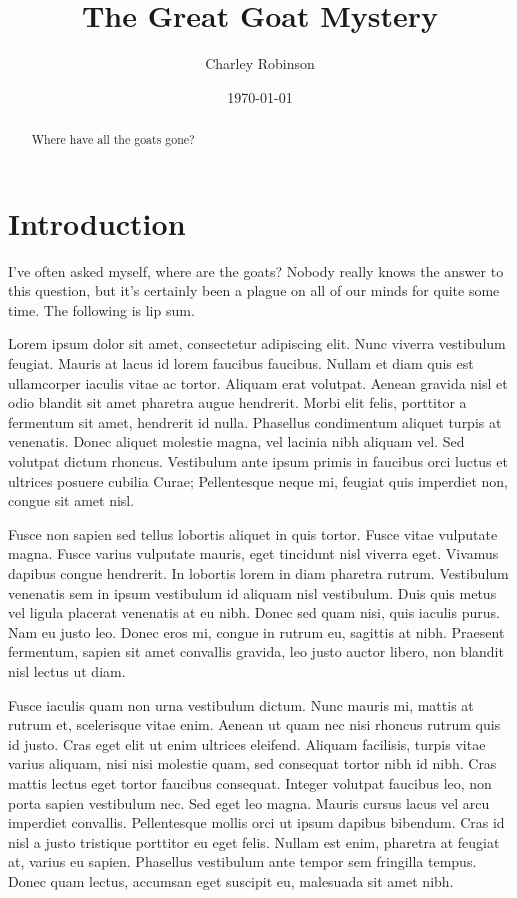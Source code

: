 \documentclass[12pt]{article}
\begin{document}
\title{The Great Goat Mystery}
\author{Charley Robinson}
\date{\today}
\maketitle

\begin{abstract}
Where have all the goats gone?
\end{abstract}

\pagebreak

\section{Introduction}

I've often asked myself, where are the goats? Nobody really knows the answer to this question, but it's certainly been a plague on all of our minds for quite some time. The following is lip sum.

Lorem ipsum dolor sit amet, consectetur adipiscing elit. Nunc viverra vestibulum feugiat. Mauris at lacus id lorem faucibus faucibus. Nullam et diam quis est ullamcorper iaculis vitae ac tortor. Aliquam erat volutpat. Aenean gravida nisl et odio blandit sit amet pharetra augue hendrerit. Morbi elit felis, porttitor a fermentum sit amet, hendrerit id nulla. Phasellus condimentum aliquet turpis at venenatis. Donec aliquet molestie magna, vel lacinia nibh aliquam vel. Sed volutpat dictum rhoncus. Vestibulum ante ipsum primis in faucibus orci luctus et ultrices posuere cubilia Curae; Pellentesque neque mi, feugiat quis imperdiet non, congue sit amet nisl.

Fusce non sapien sed tellus lobortis aliquet in quis tortor. Fusce vitae vulputate magna. Fusce varius vulputate mauris, eget tincidunt nisl viverra eget. Vivamus dapibus congue hendrerit. In lobortis lorem in diam pharetra rutrum. Vestibulum venenatis sem in ipsum vestibulum id aliquam nisl vestibulum. Duis quis metus vel ligula placerat venenatis at eu nibh. Donec sed quam nisi, quis iaculis purus. Nam eu justo leo. Donec eros mi, congue in rutrum eu, sagittis at nibh. Praesent fermentum, sapien sit amet convallis gravida, leo justo auctor libero, non blandit nisl lectus ut diam.

Fusce iaculis quam non urna vestibulum dictum. Nunc mauris mi, mattis at rutrum et, scelerisque vitae enim. Aenean ut quam nec nisi rhoncus rutrum quis id justo. Cras eget elit ut enim ultrices eleifend. Aliquam facilisis, turpis vitae varius aliquam, nisi nisi molestie quam, sed consequat tortor nibh id nibh. Cras mattis lectus eget tortor faucibus consequat. Integer volutpat faucibus leo, non porta sapien vestibulum nec. Sed eget leo magna. Mauris cursus lacus vel arcu imperdiet convallis. Pellentesque mollis orci ut ipsum dapibus bibendum. Cras id nisl a justo tristique porttitor eu eget felis. Nullam est enim, pharetra at feugiat at, varius eu sapien. Phasellus vestibulum ante tempor sem fringilla tempus. Donec quam lectus, accumsan eget suscipit eu, malesuada sit amet nibh.
\end{document}
